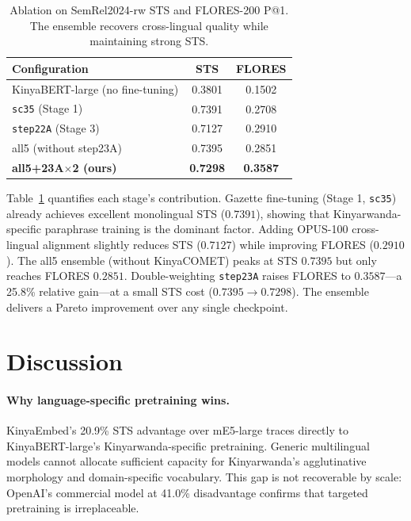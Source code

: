 \documentclass[letterpaper]{article} %
\begin{document}
\begin{table}[t]
\centering
\small
\begin{tabular}{lcc}
\toprule
\textbf{Configuration}              & \textbf{STS} & \textbf{FLORES} \\
\midrule
KinyaBERT-large (no fine-tuning)    & 0.3801 & 0.1502 \\
\texttt{sc35} (Stage 1)             & 0.7391 & 0.2708 \\
\texttt{step22A} (Stage 3)          & 0.7127 & 0.2910 \\
all5 (without step23A)              & 0.7395 & 0.2851 \\
\midrule
\textbf{all5+23A$\times$2 (ours)}   & \textbf{0.7298} & \textbf{0.3587} \\
\bottomrule
\end{tabular}
\caption{Ablation on SemRel2024-rw STS and FLORES-200 P@1. The ensemble
recovers cross-lingual quality while maintaining strong STS.}
\label{tab:ablation}
\end{table}

Table~\ref{tab:ablation} quantifies each stage's contribution. Gazette
fine-tuning (Stage 1, \texttt{sc35}) already achieves excellent monolingual STS
($0.7391$), showing that Kinyarwanda-specific paraphrase training is the
dominant factor. Adding OPUS-100 cross-lingual alignment slightly reduces STS
($0.7127$) while improving FLORES ($0.2910$). The all5 ensemble (without
KinyaCOMET) peaks at STS $0.7395$ but only reaches FLORES $0.2851$.
Double-weighting \texttt{step23A} raises FLORES to $0.3587$---a 25.8\%
relative gain---at a small STS cost ($0.7395 \to 0.7298$). The ensemble
delivers a Pareto improvement over any single checkpoint.

\section{Discussion}

\paragraph{Why language-specific pretraining wins.}
KinyaEmbed's 20.9\% STS advantage over mE5-large traces directly to
KinyaBERT-large's Kinyarwanda-specific pretraining. Generic multilingual
models cannot allocate sufficient capacity for Kinyarwanda's agglutinative
morphology and domain-specific vocabulary. This gap is not recoverable by
scale: OpenAI's commercial model at 41.0\% disadvantage confirms that
targeted pretraining is irreplaceable.
\end{document}
